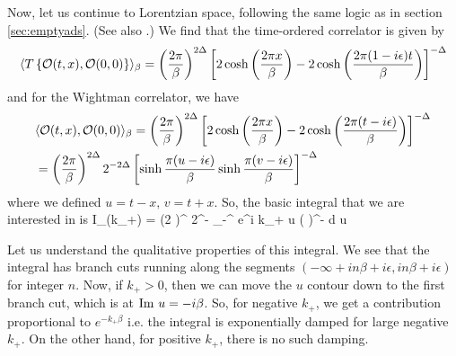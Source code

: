 Now, let us continue to Lorentzian space, following the same logic as in section \ref{sec:emptyads}. (See also \cite{Skenderis:2008dg}.)
We find that
the time-ordered correlator is given by
\[
\langle T\left\{{\cal O}(t,x), {\cal O}(0,0) \right\} \rangle_{\beta} = \left({2 \pi \over \beta} \right)^{2 \Delta}  \left[2 \cosh \left({2 \pi x \over \beta} \right) - 
2 \cosh \left( {2 \pi (1 - i \epsilon) t \over \beta} \right) \right]^{-\Delta}
 \]
and for the Wightman correlator, we have
\[
\begin{split}
&\langle {\cal O}(t,x), {\cal O}(0,0) \rangle_{\beta} = \left({2 \pi \over \beta} \right)^{2 \Delta}  \left[2 \cosh \left({2 \pi x \over \beta} \right) - 
2 \cosh \left( {2 \pi (t - i \epsilon) \over \beta} \right)  \right]^{-\Delta} \\
&= \left({2 \pi \over \beta} \right)^{2 \Delta} 2^{-2 \Delta} \left[ \sinh {\pi (u - i \epsilon) \over \beta} \sinh{\pi (v - i \epsilon) \over \beta} \right]^{-\Delta}
\end{split}
 \]
where we defined $u=t-x,\,v=t+x$. So, the basic integral that we are interested in is
\be
\label{ibetadef}
I_{\beta}(k_{+}) = \left({2 \pi \over \beta} \right)^{ \Delta} 2^{- \Delta} \int_{-\infty}^{\infty} e^{i k_{+} u}  \left( \right)^{-\Delta} d u
\ee

Let us understand the qualitative properties of this integral. We see that the integral has branch cuts running along the segments $(-\infty + i n \beta + i \epsilon, i n \beta + i \epsilon)$ for integer $n$. Now, if $k_{+} > 0$, then we can move the $u$ contour down to the first branch cut, which is at ${\rm Im}~u = - i \beta$. So, for negative $k_{+}$, we get a contribution proportional to
$e^{-k_+ \beta}$ i.e. the integral is exponentially damped for large negative $k_{+}$.  On the other hand, for positive $k_{+}$, there is no such damping. 

